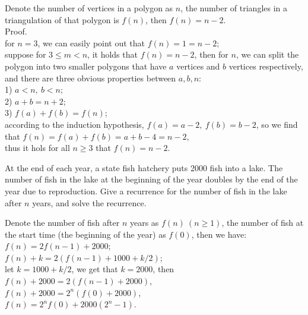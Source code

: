 \documentclass[11pt, a4paper, UTF8]{ctexart}
\begin{document}
\begin{solution}
  Denote the number of vertices in a polygon as $n$, the number of triangles 
  in a triangulation of that polygon is $f(n)$, then $f(n) = n - 2.$\\
  Proof.\\
  for $n = 3$, we can easily point out that $f(n) = 1 = n - 2$;\\
  suppose for $3 \leq m < n$, it holds that $f(n) = n - 2$, then for $n$,
  we can split the polygon into two smaller polygons that have $a$ vertices 
  and $b$ vertices respectively, and there are three obvious properties 
  between $a,b,n$:\\
  1) $a < n,~b < n$;\\
  2) $a + b = n + 2$;\\
  3) $f(a) + f(b) = f(n)$;\\
  according to the induction hypothesis, $f(a) = a - 2,~f(b) = b - 2$, so 
  we find that $f(n) = f(a) + f(b) = a + b - 4 = n - 2$,\\
  thus it hols for all $n \geq 3$ that $f(n) = n - 2$. 
\end{solution}
\begin{problem}[CS: 4.2.8]
  At the end of each year, a state fish hatchery puts 2000 fish into a lake. 
  The number of fish in the lake at the beginning of the year doubles by the 
  end of the year due to reproduction. Give a recurrence for the number of 
  fish in the lake after $n$ years, and solve the recurrence.	
\end{problem}


\begin{solution}
  Denote the number of fish after $n$ years as $f(n)~(n \geq 1)$, the number 
  of fish at the start time (the beginning of the year) as $f(0)$, then we 
  have:\\
  $f(n) = 2f(n - 1) + 2000$;\\
  $f(n) + k = 2(f(n - 1) + 1000 + k/2)$;\\
  let $k = 1000 + k/2$, we get that $k = 2000$, then\\
  $f(n) + 2000 = 2(f(n - 1) + 2000)$,\\
  $f(n) + 2000 = 2^{n}(f(0) + 2000)$,\\
  $f(n) = 2^{n}f(0) + 2000(2^{n} - 1)$.
\end{solution}
\end{document}
